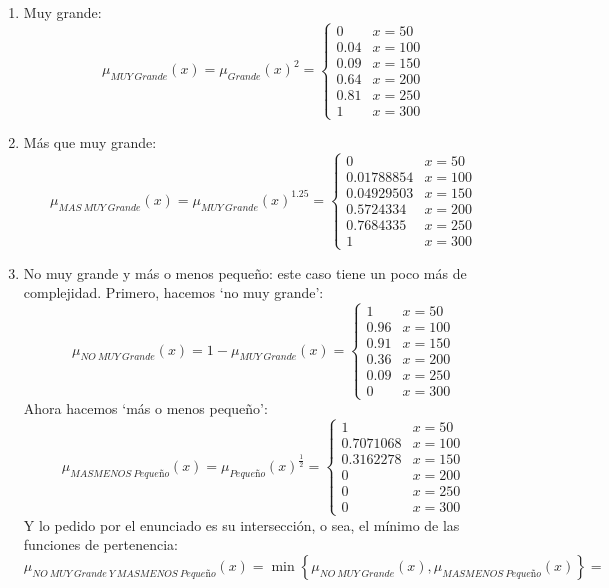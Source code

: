 \documentclass[
]{article}
\begin{document}
\begin{enumerate}
\def\labelenumi{\arabic{enumi}.}
\item
  Muy grande:
  \[\mu_{MUY\ Grande}\left(x\right)=\mu_{Grande}\left(x\right)^{2}=\begin{cases}
  0 & x=50\\
  0.04 & x=100\\
  0.09 & x=150\\
  0.64 & x=200\\
  0.81 & x=250\\
  1 & x=300
  \end{cases}\]
\item
  Más que muy grande:
  \[\mu_{MAS\ MUY\ Grande}\left(x\right)=\mu_{MUY\ Grande}\left(x\right)^{1.25}=\begin{cases}
  0 & x=50\\
  0.01788854 & x=100\\
  0.04929503 & x=150\\
  0.5724334 & x=200\\
  0.7684335 & x=250\\
  1 & x=300
  \end{cases}\]
\item
  No muy grande y más o menos pequeño: este caso tiene un poco más de
  complejidad. Primero, hacemos `no muy grande':
  \[\mu_{NO\ MUY\ Grande}\left(x\right)=1-\mu_{MUY\ Grande}\left(x\right)=\begin{cases}
  1 & x=50\\
  0.96 & x=100\\
  0.91 & x=150\\
  0.36 & x=200\\
  0.09 & x=250\\
  0 & x=300
  \end{cases}\] Ahora hacemos `más o menos pequeño':
  \[\mu_{MASMENOS\ Pequeño}\left(x\right)=\mu_{Pequeño}\left(x\right)^{\frac{1}{2}}=\begin{cases}
  1 & x=50\\
  0.7071068 & x=100\\
  0.3162278 & x=150\\
  0 & x=200\\
  0 & x=250\\
  0 & x=300
  \end{cases}\] Y lo pedido por el enunciado es su intersección, o sea,
  el mínimo de las funciones de pertenencia:
  \[\mu_{NO\ MUY\ Grande\ Y\ MASMENOS\ Pequeño}\left(x\right)=\min\left\{ \mu_{NO\ MUY\ Grande}\left(x\right),\mu_{MASMENOS\ Pequeño}\left(x\right)\right\} =\]

\end{enumerate}
\end{document}
